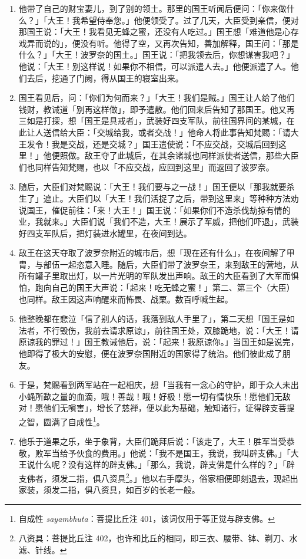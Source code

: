 \begin{enumerate}
\item 他带了自己的财宝妻儿，到了别的领土。那里的国王听闻后便问：「你来做什么？」「大王！我希望侍奉您。」他便领受了。过了几天，大臣受到亲信，便对那国王说：「大王！我看见无蜂之蜜，还没有人吃过。」国王想「难道他是心存戏弄而说的」，便没有听。他得了空，又再次告知，善加解释，国王问：「那是什么？」「大王！波罗奈的国土。」国王说：「把我领去后，你想谋害我吧？」他说：「大王！别这样说！如果你不相信，可以派遣人去。」他便派遣了人。他们去后，挖通了门阙，得从国王的寝室出来。
\item 国王看见后，问：「你们为何而来？」「大王！我们是贼。」国王让人给了他们钱财，教诫道「别再这样做」，即予遣散。他们回来后告知了那国王。他又再三如是打探，想「国王是具戒者」，武装好四支军队，前往国界间的某城，在此让人送信给大臣：「交城给我，或者交战！」他命人将此事告知梵赐：「请大王发令！我是交战，还是交城？」国王遣使说：「不应交战，交城后回到这里！」他便照做。敌王夺了此城后，在其余诸城也同样派使者送信，那些大臣们也同样告知梵赐，也以「不应交战，应回到这里」而返回了波罗奈。
\item 随后，大臣们对梵赐说：「大王！我们要与之一战！」国王便以「那我就要杀生了」遮止。大臣们以「大王！我们活捉了之后，带到这里来」等种种方法劝说国王，催促前往：「来！大王！」国王说：「如果你们不造杀伐劫掠有情的业，我就来。」大臣们说「我们不造，大王！展示了军威，把他们吓退」，武装好四支军队后，把灯装进水罐里，在夜间到达。
\item 敌王在这天夺取了波罗奈附近的城市后，想「现在还有什么」，在夜间解了甲胄，与部伍一起恣意入睡。随后，大臣们带了波罗奈王，来到敌王的营地，从所有罐子里取出灯，以一片光明的军队发出声响。敌王的大臣看到了大军而惧怕，跑向自己的国王大声说：「起来！吃无蜂之蜜！」第二、第三个（大臣）也同样。敌王因这声响醒来而怖畏、战栗。数百呼喊生起。
\item 他整晚都在悲泣「信了别人的话，我落到敌人手里了」，第二天想「国王是如法者，不行毁伤，我前去请求原谅」，前往国王处，双膝跪地，说：「大王！请原谅我的罪过！」国王教诫他后，说：「起来！我原谅你。」当国王如是说完，他即得了极大的安慰，便在波罗奈国附近的国家得了统治。他们彼此成了朋友。
\item 于是，梵赐看到两军站在一起相庆，想「当我有一念心的守护，即于众人未出小蝇所歃之量的血滴，哦！善哉！哦！好极！愿一切有情快乐！愿他们无敌对！愿他们无嗔害」，增长了慈禅，便以此为基础，触知诸行，证得辟支菩提之智，圆满了自成性\footnote{自成性 \textit{sayambhuta}：菩提比丘注 401，该词仅用于等正觉与辟支佛。}。
\item 他乐于道果之乐，坐于象背，大臣们跪拜后说：「该走了，大王！胜军当受恭敬，败军当给予伙食的费用。」他说：「我不是国王，我说，我叫辟支佛。」「大王说什么呢？没有这样的辟支佛。」「那么，我说，辟支佛是什么样的？」「辟支佛者，须发二指，俱八资具\footnote{八资具：菩提比丘注 402，也许和比丘的相同，即三衣、腰带、钵、剃刀、水滤、针线。}。」他以右手摩头，俗家相便即刻退去，现起出家装，须发二指，俱八资具，如百岁的长老一般。

\end{enumerate}
